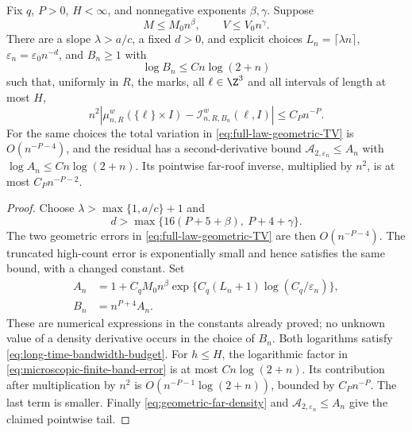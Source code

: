 \begin{corollary}
\label{cor:linear-cutoff-microscopic-inversion}
Fix $q$, $P>0$, $H<\infty$, and nonnegative exponents $\beta,\gamma$.
Suppose
\[
 M\le M_0 n^\beta,\qquad V\le V_0 n^\gamma.
\]
There are a slope $\lambda>a/c$, a fixed $d>0$, and explicit choices
$L_n=\lceil\lambda n\rceil$, $\varepsilon_n=\varepsilon_0 n^{-d}$,
and $B_n\ge1$ with
\begin{equation}\label{eq:long-time-bandwidth-budget}
 \log B_n\le C n\log(2+n)
\end{equation}
such that, uniformly in $R$, the marks, all $\ell\in\Z^3$ and all
intervals of length at most $H$,
\begin{equation}\label{eq:microscopic-uniform-inversion}
 n^2\left|\mu_{n,R}^w(\{\ell\}\times I)
                    -\mathcal I_{n,R,B_n}^{w}(\ell,I)\right|
       \le C_P n^{-P}.
\end{equation}
For the same choices the total variation in
\eqref{eq:full-law-geometric-TV} is $O(n^{-P-4})$, and the residual
has a second-derivative bound $\mathcal A_{2,\varepsilon_n}\le A_n$
with $\log A_n\le C n\log(2+n)$. Its pointwise far-roof inverse,
multiplied by $n^2$, is at most $C_Pn^{-P-2}$.
\end{corollary}
\begin{proof}
Choose $\lambda>\max\{1,a/c\}+1$ and
\[
 d>\max\{16(P+5+\beta),\ P+4+\gamma\}.
\]
The two geometric errors in \eqref{eq:full-law-geometric-TV} are then
$O(n^{-P-4})$. The truncated high-count error is exponentially small
and hence satisfies the same bound, with a changed constant. Set
\begin{equation}\label{eq:explicit-long-time-bandwidth}
 \begin{split}
 A_n&=1+C_qM_0 n^\beta
           \exp\{C_q(L_n+1)\log(C_q/\varepsilon_n)\},\\
 B_n&=n^{P+4}A_n.
 \end{split}
\end{equation}
These are numerical expressions in the constants already proved; no
unknown value of a density derivative occurs in the choice of $B_n$.
Both logarithms satisfy \eqref{eq:long-time-bandwidth-budget}.
For $h\le H$, the logarithmic factor in
\eqref{eq:microscopic-finite-band-error} is at most $C n\log(2+n)$.
Its contribution after multiplication by $n^2$ is
$O(n^{-P-1}\log(2+n))$, bounded by $C_Pn^{-P}$. The last term is
smaller. Finally \eqref{eq:geometric-far-density} and
$\mathcal A_{2,\varepsilon_n}\le A_n$ give the claimed pointwise tail.
\end{proof}

